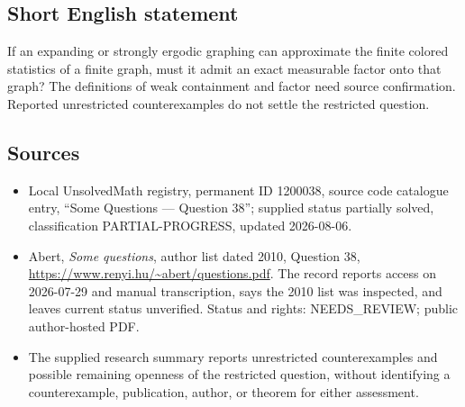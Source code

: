 \documentclass[11pt]{article}
\begin{document}
\subsection{Short English statement}
If an expanding or strongly ergodic graphing can approximate the finite colored statistics of a finite graph, must it admit an exact measurable factor onto that graph? The definitions of weak containment and factor need source confirmation. Reported unrestricted counterexamples do not settle the restricted question.
\subsection{Sources}
\begin{itemize}
\item Local UnsolvedMath registry, permanent ID 1200038, source code catalogue entry, ``Some Questions --- Question 38''; supplied status partially solved, classification PARTIAL-PROGRESS, updated 2026-08-06.
\item Abert, \emph{Some questions}, author list dated 2010, Question 38, \url{https://www.renyi.hu/~abert/questions.pdf}. The record reports access on 2026-07-29 and manual transcription, says the 2010 list was inspected, and leaves current status unverified. Status and rights: NEEDS\_REVIEW; public author-hosted PDF.
\item The supplied research summary reports unrestricted counterexamples and possible remaining openness of the restricted question, without identifying a counterexample, publication, author, or theorem for either assessment.
\end{itemize}
\end{document}
